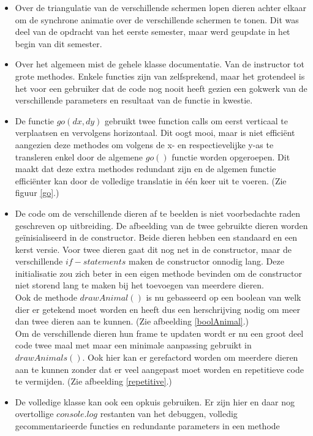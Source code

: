 \documentclass[a4paper,11pt]{article}
\begin{document}
\begin{itemize}
	\item Over de triangulatie van de verschillende schermen lopen dieren achter elkaar om de synchrone animatie over de verschillende schermen te tonen. Dit was deel van de opdracht van het eerste semester, maar werd geupdate in het begin van dit semester.
	
	\item Over het algemeen mist de gehele klasse documentatie. Van de instructor tot grote methodes. Enkele functies zijn van zelfsprekend, maar het grotendeel is het voor een gebruiker dat de code nog nooit heeft gezien een gokwerk van de verschillende parameters en resultaat van de functie in kwestie.
	
	\item De functie $go(dx, dy)$ gebruikt twee function calls om eerst verticaal te verplaatsen en vervolgens horizontaal. Dit oogt mooi, maar is niet efficiënt aangezien deze methodes om volgens de x- en respectievelijke y-as te transleren enkel door de algemene $go()$ functie worden opgeroepen. Dit maakt dat deze extra methodes redundant zijn en de algemen functie efficiënter kan door de volledige translatie in één keer uit te voeren. (Zie figuur \ref{go}.)
	
	\item De code om de verschillende dieren af te beelden is niet voorbedachte raden geschreven op uitbreiding. De afbeelding van de twee gebruikte dieren worden geïnisialiseerd in de constructor. Beide dieren hebben een standaard en een kerst versie. Voor twee dieren gaat dit nog net in de constructor, maar de verschillende $if-statements$ maken de constructor onnodig lang. Deze initialisatie zou zich beter in een eigen methode bevinden om de constructor niet storend lang te maken bij het toevoegen van meerdere dieren.\\
	Ook de methode $drawAnimal()$ is nu gebasseerd op een boolean van welk dier er getekend moet worden en heeft dus een herschrijving nodig om meer dan twee dieren aan te kunnen. (Zie afbeelding \ref{boolAnimal}.)\\
	Om de verschillende dieren hun frame te updaten wordt er nu een groot deel code twee maal met maar een minimale aanpassing gebruikt in $drawAnimals()$. Ook hier kan er gerefactord worden om meerdere dieren aan te kunnen zonder dat er veel aangepast moet worden en repetitieve code te vermijden. (Zie afbeelding \ref{repetitive}.)
	
	\item De volledige klasse kan ook een opkuis gebruiken. Er zijn hier en daar nog overtollige $console.log$ restanten van het debuggen, volledig gecommentarieerde functies en redundante parameters in een methode
\end{itemize}
\end{document}

